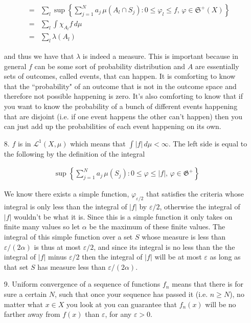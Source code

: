 \documentclass[oneside]{book}
\begin{document}
\begin{enumerate}
\begin{eqnarray}
&=& \sum_l \sup  \left\{\sum_{j=1}^N a_j\, \mu (A_l \cap S_j): 0 \le \varphi_l \le f,\, \varphi \in \mathfrak{S}^+(X) \right\} \nonumber \\
&=& \sum_l \int \chi_{A_l} f\, d\mu\nonumber \\
&=& \sum_l \lambda(A_l)
\end{eqnarray}

and thus we have that $\lambda$ is indeed a measure. This is important because in general $f$ can be some sort of probability distribution and $A$ are essentially sets of outcomes, called events, that can happen. It is comforting to know that the ``probability" of an outcome that is not in the outcome space and therefore not possible happening is zero. It's also comforting to know that if you want to know the probability of a bunch of different events happening that are disjoint (i.e. if one event happens the other can't happen) then you can just add up the probabilities of each event happening on its own.

\item[8.] $f$ is in $\mathcal{L}^1(X,\mu)$ which means that $\int |f|\, d\mu < \infty$. The left side is equal to the following by the definition of the integral

\begin{eqnarray}
\sup \left\{ \sum_{j=1}^N a_j\, \mu(S_j): 0 \le \varphi \le |f|,\, \varphi \in \mathfrak{G}^+ \right\}
\end{eqnarray}

We know there exists a simple function, $\varphi_{\varepsilon/2}$ that satisfies the criteria whose integral is only less than the integral of $|f|$ by $\varepsilon/2$, otherwise the integral of $|f|$ wouldn't be what it is. Since this is a simple function it only takes on finite many values so let $\alpha$ be the maximum of these finite values. The integral of this simple function over a set $S$ whose measure is less than $\varepsilon / (2\alpha)$ is thus at most $\varepsilon / 2$, and since its integral is no less than the the integral of $|f|$ minus $\varepsilon/2$ then the integral of $|f|$ will be at most $\varepsilon$ as long as that set $S$ has measure less than $\varepsilon/ (2\alpha)$. 

\item[9.] Uniform convergence of a sequence of functions $f_n$ means that there is for sure a certain $N$, such that once your sequence has passed it (i.e. $n \ge N$), no matter what $x \in X$ you look at you can guarantee that $f_n(x)$ will be no farther away from $f(x)$ than $\varepsilon$, for any $\varepsilon > 0$.


\end{enumerate}
\end{document}
